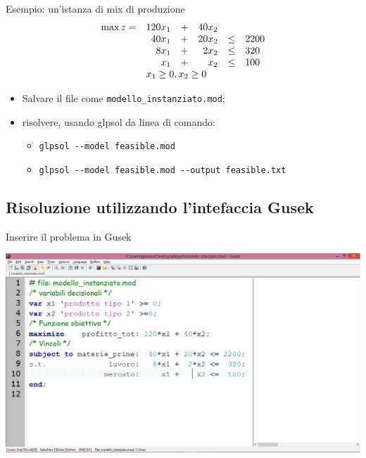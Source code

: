 \documentclass{beamer}
\begin{document}
\begin{frame}{Esempio: un'istanza di mix di produzione}
\[
\begin{array}{lrcrlll} 
               \max z = & 120 x_1&+& 40 x_2\\ 
                        &  40 x_1&+& 20 x_2&\leq & 2200\\
                        &   8 x_1&+&  2 x_2&\leq &  320 \\ 
                        &     x_1&+&    x_2&\leq &  100 \\ 
                        & \multicolumn{5}{l}{x_1   \geq  0, x_2 \geq 0} 
\end{array}
\]



\begin{itemize}
\item Salvare il file come \texttt{modello\_instanziato.mod};
\item risolvere, usando glpsol da linea di comando:
	\begin{itemize}
	\item \verb=glpsol --model feasible.mod=
	\item \verb=glpsol --model feasible.mod --output feasible.txt=
	\end{itemize}
\end{itemize}
\end{frame}

\subsection{Risoluzione utilizzando l'intefaccia Gusek}

\begin{frame}{Inserire il problema in Gusek}
\begin{center}
\includegraphics[height=0.85\textheight]{img/gusek_1}
\par\end{center}
\end{frame}
\end{document}
